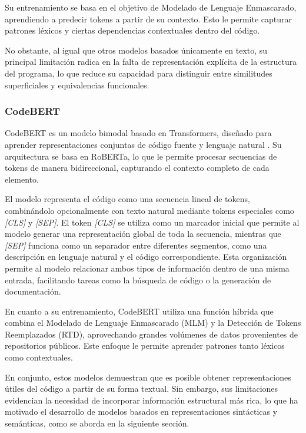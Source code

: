 Su entrenamiento se basa en el objetivo de Modelado de Lenguaje Enmascarado, aprendiendo a predecir tokens a partir de su contexto. Esto le permite capturar patrones léxicos y ciertas dependencias contextuales dentro del código.

No obstante, al igual que otros modelos basados únicamente en texto, su principal limitación radica en la falta de representación explícita de la estructura del programa, lo que reduce su capacidad para distinguir entre similitudes superficiales y equivalencias funcionales.



\subsubsection{CodeBERT}

CodeBERT es un modelo bimodal basado en Transformers, diseñado para aprender representaciones conjuntas de código fuente y lenguaje natural \cite{Alon2018Code2Vec}. Su arquitectura se basa en RoBERTa, lo que le permite procesar secuencias de tokens de manera bidireccional, capturando el contexto completo de cada elemento.

El modelo representa el código como una secuencia lineal de tokens, combinándolo opcionalmente con texto natural mediante tokens especiales como \textit{[CLS]} y \textit{[SEP]}. El token \textit{[CLS]} se utiliza como un marcador inicial que permite al modelo generar una representación global de toda la secuencia, mientras que \textit{[SEP]} funciona como un separador entre diferentes segmentos, como una descripción en lenguaje natural y el código correspondiente. Esta organización permite al modelo relacionar ambos tipos de información dentro de una misma entrada, facilitando tareas como la búsqueda de código o la generación de documentación.

En cuanto a su entrenamiento, CodeBERT utiliza una función híbrida que combina el Modelado de Lenguaje Enmascarado (MLM) y la Detección de Tokens Reemplazados (RTD), aprovechando grandes volúmenes de datos provenientes de repositorios públicos. Este enfoque le permite aprender patrones tanto léxicos como contextuales.

En conjunto, estos modelos demuestran que es posible obtener representaciones útiles del código a partir de su forma textual. Sin embargo, sus limitaciones evidencian la necesidad de incorporar información estructural más rica, lo que ha motivado el desarrollo de modelos basados en representaciones sintácticas y semánticas, como se aborda en la siguiente sección.

